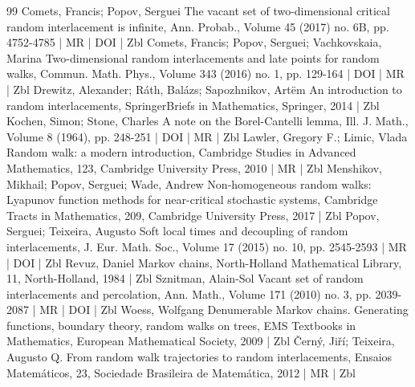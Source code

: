 \begin{thebibliography}{99}
Comets, Francis; Popov, Serguei The vacant set of two-dimensional critical random interlacement is infinite, Ann. Probab., Volume 45 (2017) no. 6B, pp. 4752-4785 | MR | DOI | Zbl
Comets, Francis; Popov, Serguei; Vachkovskaia, Marina Two-dimensional random interlacements and late points for random walks, Commun. Math. Phys., Volume 343 (2016) no. 1, pp. 129-164 | DOI | MR | Zbl
Drewitz, Alexander; Ráth, Balázs; Sapozhnikov, Artëm An introduction to random interlacements, SpringerBriefs in Mathematics, Springer, 2014 | Zbl
Kochen, Simon; Stone, Charles A note on the Borel-Cantelli lemma, Ill. J. Math., Volume 8 (1964), pp. 248-251 | DOI | MR | Zbl
Lawler, Gregory F.; Limic, Vlada Random walk: a modern introduction, Cambridge Studies in Advanced Mathematics, 123, Cambridge University Press, 2010 | MR | Zbl
Menshikov, Mikhail; Popov, Serguei; Wade, Andrew Non-homogeneous random walks: Lyapunov function methods for near-critical stochastic systems, Cambridge Tracts in Mathematics, 209, Cambridge University Press, 2017 | Zbl
Popov, Serguei; Teixeira, Augusto Soft local times and decoupling of random interlacements, J. Eur. Math. Soc., Volume 17 (2015) no. 10, pp. 2545-2593 | MR | DOI | Zbl
Revuz, Daniel Markov chains, North-Holland Mathematical Library, 11, North-Holland, 1984 | Zbl
Sznitman, Alain-Sol Vacant set of random interlacements and percolation, Ann. Math., Volume 171 (2010) no. 3, pp. 2039-2087 | MR | DOI | Zbl
Woess, Wolfgang Denumerable Markov chains. Generating functions, boundary theory, random walks on trees, EMS Textbooks in Mathematics, European Mathematical Society, 2009 | Zbl
Černý, Jiří; Teixeira, Augusto Q. From random walk trajectories to random interlacements, Ensaios Matemáticos, 23, Sociedade Brasileira de Matemática, 2012 | MR | Zbl
\end{thebibliography}
